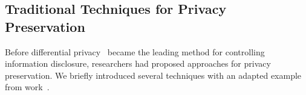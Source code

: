 




\subsection{Traditional Techniques for Privacy Preservation}
\label{subsec:TraditionalTechniquesforPrivacyPreservation}
Before differential privacy~\cite{dwork2006differential, dwork2006calibrating} became the leading method for controlling information disclosure, researchers had proposed approaches for privacy preservation. We briefly introduced several techniques with an adapted example from work~\cite{li2007t}.


